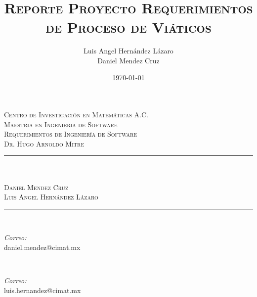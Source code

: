 \documentclass{report}
\title{\textsc{Reporte Proyecto Requerimientos de Proceso de Viáticos}}
\author{Luis Angel Hernández Lázaro \\ Daniel Mendez Cruz}
\date{\today}
\makeatletter
\let\thetitle\@title
\makeatother
\begin{document}

\begin{titlepage}
	\centering
    \vspace*{0.5 cm}
    
    
    \begin{figure}
		\centering
	\end{figure}
    \textsc{\LARGE Centro de Investigación en Matemáticas A.C.}\\[1.0 cm]
	\textsc{\Large Maestría en Ingeniería de Software}\\[0.5 cm]
	\textsc{\large Requerimientos de Ingeniería de Software\\Dr. Hugo Arnoldo Mitre}\\[0.5 cm]
	\rule{\linewidth}{0.2 mm} \\[0.4 cm]
	{ \huge \bfseries \thetitle}\\ \textsc{\large Daniel Mendez Cruz\\ Luis Angel Hernández Lázaro}
	\rule{\linewidth}{0.2 mm} \\[1.5 cm]
	
	\begin{minipage}{0.5\textwidth}
		\begin{flushleft} \large
			\emph{Correo:}\\
			daniel.mendez@cimat.mx
		\end{flushleft}
	\end{minipage}~
	\begin{minipage}{0.4\textwidth}
		\begin{flushright} \large
			\emph{Correo:} \\
			luis.hernandez@cimat.mx
		\end{flushright}
	\end{minipage}\\[2 cm]
		

\end{titlepage}
\end{document}
